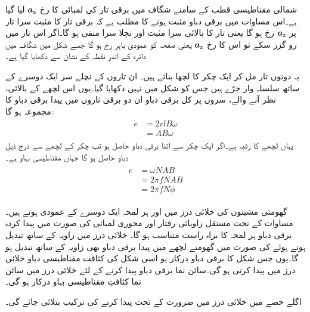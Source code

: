 شمالی مقناطیسی قطب کے سامنے شگاف میں برقی تار کی لمبائی کا رخ ${\boldsymbol{a}}_{\textup{z}}$ لیا گیا ہے۔اس مساوات میں برقی دباو  مثبت ہونے کا مطلب ہے کہ برقی تار کا مثبت سرا تار پر  ${\boldsymbol{a}}_{\textup{z}}$ رخ ہو گا یعنی تار کا بالائی سرا مثبت اور نچلا  سرا منفی ہو گا۔اگر اس تار میں  رو گزر سکے تو اس کا رخ ${\boldsymbol{a}}_{\textup{z}}$ یعنی صفحہ کو عمودی  باہر رخ ہو گا جسے شکل  میں  شگاف میں دائرہ کے اندر نقطہ کے نشان سے دکھایا گیا ہے۔ 

یہ دونوں  تار مل کر ایک چکر کا لچھا بناتے ہیں۔ ان تاروں  کے نچلے سر ایک دوسرے کے ساتھ سلسلہ وار جڑے ہیں جس کو شکل میں نہیں دکھایا گیا۔یوں اس لچھے کے بالائی،  نظر آنے والے،  سروں پر کل برقی دباو  ان دو برقی تاروں میں پیدا برقی دباو  کا مجموعہ ہو گا:
\begin{gather}
\begin{aligned}
e&=2r l B \omega\\
&=A B \omega
\end{aligned}
\end{gather}
یہاں لچھے کا رقبہ   ہے۔اگر ایک چکر سے اتنا برقی دباو حاصل ہو تب  چکر کے لچھے  سے درج ذیل دباو حاصل ہو گا جہاں  مقناطیسی بہاو ہے۔
\begin{gather}
\begin{aligned}\label{مساوات_گھومتے_مشین_پیدا_دباو}
e&=\omega N A B\\
&=2 \pi f N A B\\
&=2 \pi f N \phi
\end{aligned}
\end{gather}

گھومتی مشینوں کی خلائی درز میں   اور   ہر لمحہ ایک دوسرے کے عمودی ہوتے ہیں۔مساوات   کے تحت مستقل زاویائی  رفتار اور محوری لمبائی کی صورت میں پیدا کردہ برقی دباو  ہر لمحہ   کا براہ راست متناسب ہو گا۔ خلائی درز میں زاویہ کے ساتھ  تبدیل ہوتے ہوئے  کی صورت میں گھومتے لچھے میں پیدا برقی دباو بھی زاویہ کے ساتھ تبدیل ہو گا۔یوں جس شکل کا برقی دباو درکار ہو اسی شکل کی کثافت مقناطیسی دباو خلائی درز میں پیدا کرنی ہو گی۔سائن نما برقی دباو پیدا کرنے کے لئے   خلائی درز میں  سائن نما کثافتِ مقناطیسی بہاو درکار ہو گی۔

اگلے حصے میں خلائی درز میں ضرورت کے تحت   پیدا کرنے کی ترکیب بتلائی جائے گی۔

